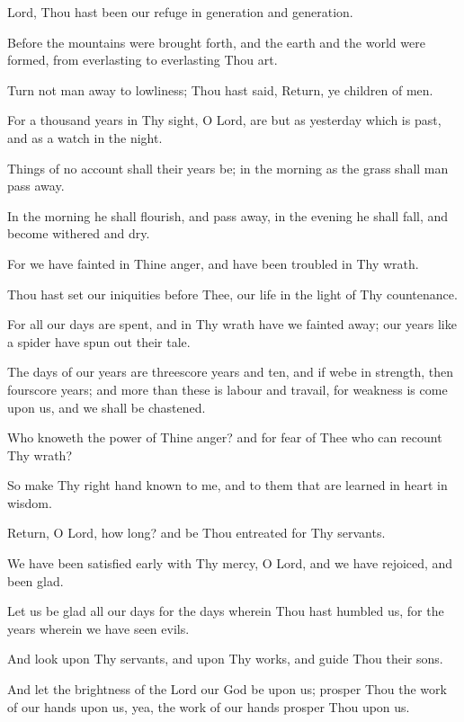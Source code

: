 Lord, Thou hast been our refuge in generation and generation.

Before the mountains were brought forth, and the earth and the world were formed, from everlasting to everlasting Thou art.

Turn not man away to lowliness; Thou hast said, Return, ye children of men.

For a thousand years in Thy sight, O Lord, are but as yesterday which is past, and as a watch in the night.

Things of no account shall their years be; in the morning as the grass shall man pass away.

In the morning he shall flourish, and pass away, in the evening he shall fall, and become withered and dry.

For we have fainted in Thine anger, and have been troubled in Thy wrath.

Thou hast set our iniquities before Thee, our life in the light of Thy countenance.

For all our days are spent, and in Thy wrath have we fainted away; our years like a spider have spun out their tale.

The days of our years are threescore years and ten, and if webe in strength, then fourscore years; and more than these is labour and travail, for weakness is come upon us, and we shall be
chastened.

Who knoweth the power of Thine anger? and for fear of Thee who can recount Thy wrath?

So make Thy right hand known to me, and to them that are learned in heart in wisdom.

Return, O Lord, how long? and be Thou entreated for Thy servants.

We have been satisfied early with Thy mercy, O Lord, and we have rejoiced, and been glad.

Let us be glad all our days for the days wherein Thou hast humbled us, for the years wherein we have seen evils.

And look upon Thy servants, and upon Thy works, and guide Thou their sons.

And let the brightness of the Lord our God be upon us; prosper Thou the work of our hands upon us, yea, the work of our hands prosper Thou upon us.
